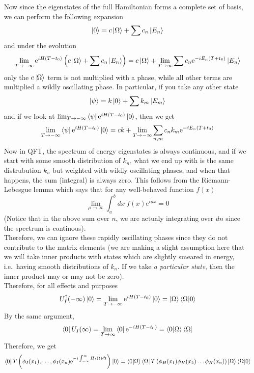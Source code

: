 \documentclass[11pt]{article}
\newcommand{\e}{\mathrm{e}}
\numberwithin{equation}{section}
\begin{document}
Now since the eigenstates of the full Hamiltonian forms a complete set of basis, we can perform the following expansion 
\begin{equation*}
    \ket{0} = c\ket{\Omega} + \sum c_n \ket{E_n}
\end{equation*}
and under the evolution
\begin{equation*}
    \lim_{T\to -\infty} \e^{iH(T-t_0)}\left(c\ket{\Omega} + \sum c_n \ket{E_n}\right) =c\ket{\Omega} +  \lim_{T\to \infty} \sum c_n \e^{-iE_n(T+t_0)}\ket{E_n}
\end{equation*}
only the \(c\ket{\Omega}\) term is not multiplied with a phase, while all other terms are multiplied a wildly oscillating phase. In particular, if you take any other state 
\begin{equation*}
    \ket{\psi} = k\ket{0} + \sum k_m \ket{E_m}
\end{equation*}
and if we look at \(\lim_{T\to -\infty} \bra{\psi}  \e^{iH(T-t_0)} \ket{0}\), then we get 
\begin{equation*}
    \lim_{T\to -\infty} \bra{\psi}  \e^{iH(T-t_0)} \ket{0} = ck + \lim_{T\to -\infty} \sum_{n,m}c_n k_m \e^{-iE_n(T+t_0)}
\end{equation*}
Now in QFT, the spectrum of energy eigenstates is always continuous, and if we start with some smooth distribution of \(k_n\), what we end up with is the same distrubution \(k_n\) but weighted with wildly oscillating phases, and when that happens, the sum (integral) is always zero. This follows from the Riemann-Lebesgue lemma which says that for any well-behaved function \(f(x)\) 
\begin{equation*}
    \lim_{\mu\to \infty} \int_a^b dx~f(x)\e^{i\mu x} = 0
\end{equation*}
(Notice that in the above sum over \(n\), we are actualy integrating over \(dn\) since the spectrum is continous).\\
Therefore, we can ignore these rapidly oscillating phases since they do not contribute to the matrix elements (we are making a slight assumption here that we will take inner products with states which are slightly smeared in energy, i.e.\ having smooth distributions of \(k_n\). If we take \textit{a particular state}, then the inner product may or may not be zero). \\

Therefore, for all effects and purposes 
\begin{equation*}
    U_I^\dagger (-\infty)\ket{0} = \lim_{T\to -\infty} \e^{iH(T-t_0)}\ket{0} = \ket{\Omega} \braket{\Omega|0}
\end{equation*}
By the same argument, 
\begin{equation*}
    \bra{0} U_I(\infty) = \lim_{T\to \infty} \bra{0}\e^{-iH(T-t_0)} = \braket{0|\Omega} \bra{\Omega}
\end{equation*}
Therefore, we get 
\begin{equation*}
    \bra{0} T\left( \phi_I(x_1),\ldots,\phi_I(x_n)  \e^{-i\int_{-\infty}^{\infty}H_I(t)dt}\right) \ket{0} = \braket{0|\Omega} \bra{\Omega}T\left(  \phi_H(x_1)\phi_H(x_2)\ldots\phi_H(x_n) \right)\ket{\Omega} \braket{\Omega|0}
\end{equation*}
\end{document}

